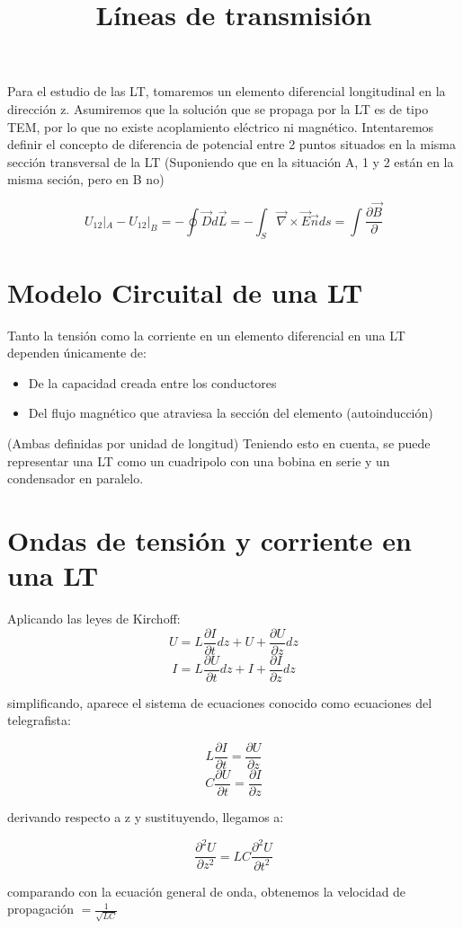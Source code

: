 \documentclass[12pt]{article}
\title{L\'ineas de transmisi\'on}
\begin{document}
Para el estudio de las LT, tomaremos un elemento diferencial longitudinal en la dirección z.
Asumiremos que la soluci\'on que se propaga por la LT es de tipo TEM, por lo que no existe acoplamiento el\'ectrico ni magn\'etico.
Intentaremos definir el concepto de diferencia de potencial entre 2 puntos situados en la misma secci\'on transversal de la LT
(Suponiendo que en la situaci\'on A, 1 y 2 están en la misma seci\'on, pero en B no)

$$U_{12}|_A - U_{12}|_B = - \oint \vec{D}d\vec{L} = -\int_S \vec{\nabla} \times \vec{E}\vec{n}ds = \int \frac{\partial \vec{B}}{\partial}$$

\section{Modelo Circuital de una LT}
Tanto la tensi\'on como la corriente en un elemento diferencial en una LT dependen \'unicamente de:
\begin{itemize}
	\item De la capacidad creada entre los conductores
	\item Del flujo magnético que atraviesa la secci\'on del elemento (autoinducci\'on)
\end{itemize}

(Ambas definidas por unidad de longitud)
Teniendo esto en cuenta, se puede representar una LT como un cuadripolo con una bobina en serie y un condensador en paralelo.

\section{Ondas de tensi\'on y corriente en una LT}
Aplicando las leyes de Kirchoff:
$$U = L\frac{\partial I}{\partial t}dz + U + \frac{\partial U}{\partial z}dz$$
$$I = L\frac{\partial U}{\partial t}dz + I + \frac{\partial I}{\partial z}dz$$

simplificando, aparece el sistema de ecuaciones conocido como ecuaciones del telegrafista:

$$L\frac{\partial I}{\partial t} = \frac{\partial U}{\partial z}$$
$$C\frac{\partial U}{\partial t} = \frac{\partial I}{\partial z}$$

derivando respecto a z y sustituyendo, llegamos a:

$$\frac{\partial^2 U}{\partial z^2} = LC \frac{\partial^2 U}{\partial t^2}$$

comparando con la ecuaci\'on general de onda, obtenemos la velocidad de propagaci\'on $= \frac{1}{\sqrt{LC}}$
\end{document}

